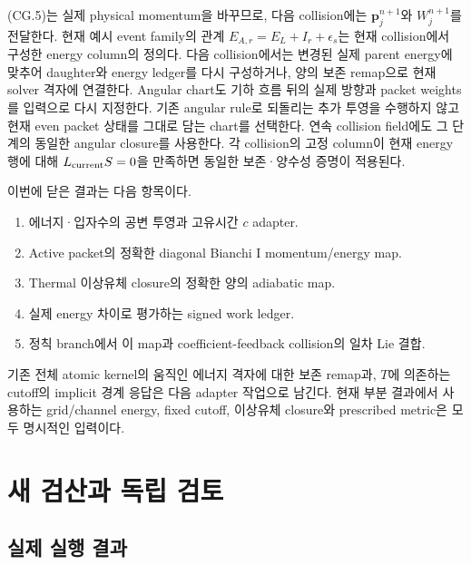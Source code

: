 (CG.5)는 실제 physical momentum을 바꾸므로, 다음 collision에는 \(\boldsymbol p_j^{n+1}\)와 \(W_j^{n+1}\)를 전달한다. 현재 예시 event family의 관계 \(E_{A,r}=E_L+I_r+\epsilon_s\)는 현재 collision에서 구성한 energy column의 정의다. 다음 collision에서는 변경된 실제 parent energy에 맞추어 daughter와 energy ledger를 다시 구성하거나, 양의 보존 remap으로 현재 solver 격자에 연결한다. Angular chart도 기하 흐름 뒤의 실제 방향과 packet weights를 입력으로 다시 지정한다. 기존 angular rule로 되돌리는 추가 투영을 수행하지 않고 현재 even packet 상태를 그대로 담는 chart를 선택한다. 연속 collision field에도 그 단계의 동일한 angular closure를 사용한다. 각 collision의 고정 column이 현재 energy 행에 대해 \(L_{\rm current}S=0\)을 만족하면 동일한 보존·양수성 증명이 적용된다.

이번에 닫은 결과는 다음 항목이다.

\begin{enumerate}
\def\labelenumi{\arabic{enumi}.}
\tightlist
\item
  에너지·입자수의 공변 투영과 고유시간 \(c\) adapter.
\item
  Active packet의 정확한 diagonal Bianchi I momentum/energy map.
\item
  Thermal 이상유체 closure의 정확한 양의 adiabatic map.
\item
  실제 energy 차이로 평가하는 signed work ledger.
\item
  정칙 branch에서 이 map과 coefficient-feedback collision의 일차 Lie 결합.
\end{enumerate}

기존 전체 atomic kernel의 움직인 에너지 격자에 대한 보존 remap과, \(T\)에 의존하는 cutoff의 implicit 경계 응답은 다음 adapter 작업으로 남긴다. 현재 부분 결과에서 사용하는 grid/channel energy, fixed cutoff, 이상유체 closure와 prescribed metric은 모두 명시적인 입력이다.

\hypertarget{uxc0c8-uxac80uxc0b0uxacfc-uxb3c5uxb9bd-uxac80uxd1a0}{%
\section{새 검산과 독립 검토}\label{uxc0c8-uxac80uxc0b0uxacfc-uxb3c5uxb9bd-uxac80uxd1a0}}

\hypertarget{uxc2e4uxc81c-uxc2e4uxd589-uxacb0uxacfc}{%
\subsection{실제 실행 결과}\label{uxc2e4uxc81c-uxc2e4uxd589-uxacb0uxacfc}}

